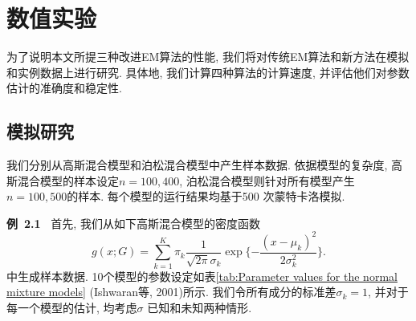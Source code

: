 \documentclass[a4paper,12pt,openany,oneside,utf-8]{ctexbook}
\newcommand{\xiaosihao}{\fontsize{12pt}{\baselineskip}\selectfont}
\begin{document}
\section{数值实验}
\label{sec:Numerical studies of parameter estimation in finite mixture models using NEW123}
为了说明本文所提三种改进EM算法的性能, 我们将对传统EM算法和新方法在模拟和实例数据上进行研究. 具体地, 我们计算四种算法的计算速度, 并评估他们对参数估计的准确度和稳定性.


\subsection{模拟研究}
\label{subsec:simulation study of parameter estimation in finite mixture models using NEW123}
我们分别从高斯混合模型和泊松混合模型中产生样本数据. 依据模型的复杂度, 高斯混合模型的样本设定$n=100, 400$, 泊松混合模型则针对所有模型产生$n=100, 500$的样本. 每个模型的运行结果均基于500 次蒙特卡洛模拟.

\textbf{\xiaosihao 例~2.1~}
首先, 我们从如下高斯混合模型的密度函数
\begin{equation*}
  g(x; G)=\sum_{k=1}^{K} \pi_{k} \frac{1}{\sqrt{2\pi}\sigma_{k}} \exp\{-\frac{(x-\mu_{k})^2}{2\sigma_{k}^2}\}.
\end{equation*}
中生成样本数据. 10个模型的参数设定如表\ref{tab:Parameter values for the normal mixture models} (Ishwaran等, 2001)所示. 我们令所有成分的标准差$\sigma_{k}=1$, 并对于每一个模型的估计, 均考虑$\sigma$ 已知和未知两种情形.
\end{document}
